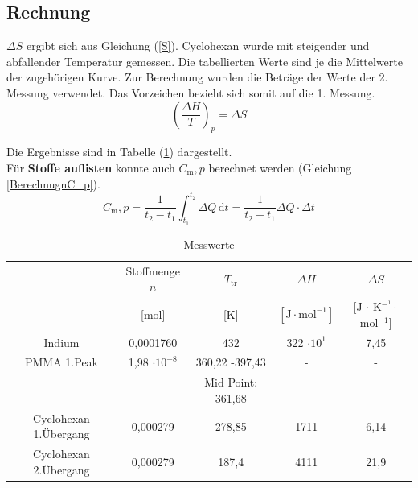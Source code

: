 \documentclass[12pt,a4paper,titlepage,headinclude,bibtotoc]{scrartcl}
\begin{document}
\subsection{Rechnung}
 
$\Delta S$ ergibt sich aus Gleichung (\ref{S}). Cyclohexan wurde mit steigender und abfallender Temperatur gemessen. Die tabellierten Werte sind je die Mittelwerte der zugehörigen Kurve. Zur Berechnung wurden die Beträge der Werte der 2. Messung verwendet. Das Vorzeichen bezieht sich somit auf die 1. Messung.\\

\begin{equation}\label{S}
\left(\frac{\Delta H}{T}\right)_p = \Delta S
\end{equation}

Die Ergebnisse sind in Tabelle (\ref{TabelleMesswerte}) dargestellt.\\
Für \textbf{Stoffe auflisten} konnte auch $C_\mathrm{m},p$ berechnet werden (Gleichung \ref{BerechnugnC_p}).\\

\begin{equation} \label{BerechnugnC_p}
C_\mathrm{m},p = \frac{1}{t_2 -t_1} \int^{t_2}_{t_1} \Delta Q\, \mathrm{d}t  = \frac{1}{t_2 -t_1} \Delta Q \cdot \Delta t 
\end{equation}







\begin{table} [h!] \label{TabelleMesswerte} %
\caption{Messwerte}
\begin{tabular}{c|c|c|c|c}
 & Stoffmenge $n$  & $T_\mathrm{tr}$  &  $\Delta H $ & $\Delta S$ \\ 
& [mol] & [K] & $[\mathrm{J} \cdot \mathrm{mol}^{-1}]$& [J $\cdot$ K$^{-^1}\cdot$mol$^{-1}$] \\
\hline 
Indium & 0,0001760 & 432 &  322 $\cdot 10^1$ & 7,45 \\ 
\hline 
PMMA 1.Peak & 1,98 $\cdot 10^{-8}$& 360,22 -397,43 &  - & - \\
&&Mid Point: 361,68&&\\ 
\hline 
Cyclohexan 1.Übergang & 0,000279 & 278,85 & 1711 & 6,14 \\ 
Cyclohexan 2.Übergang &0,000279 & 187,4& 4111 & 21,9 \\
\end{tabular}
\end{table}
\FloatBarrier
\end{document}
